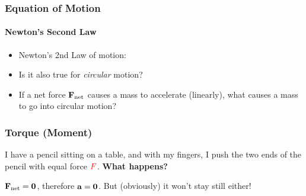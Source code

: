 \documentclass[12pt,compress,aspectratio=169]{beamer}
\newcommand{\mb}[1]{\ensuremath\mathbf{#1}}
\newcommand{\eq}[2]{\vspace{#1}{\Large\begin{displaymath}#2\end{displaymath}}}
\begin{document}
\begin{frame}
  \frametitle{Equation of Motion}
  \framesubtitle{Newton's Second Law}
  \begin{itemize}
  \item Newton's 2nd Law of motion:
    
    \eq{-.2in}{
      \mb{F}_\mathrm{net}=m\mb{a}
  }
  \item Is it also true for \emph{circular} motion?
  \item If a net force $\mb{F}_\mathrm{net}$ causes a mass to accelerate
    (linearly), what causes a mass to go into circular motion?
  \end{itemize}

\end{frame}

\begin{frame}
  \frametitle{Torque (Moment)}
  I have a pencil sitting on a table, and with my fingers, I push the two ends
  of the pencil with equal force $\textcolor{red}{F}$. \textbf{What happens?}
  \begin{center}
  \end{center}
  $\mb{F}_\mathrm{net}=\mb{0}$, therefore $\mb{a}=\mb{0}$. But (obviously) it
  won't stay still either!
\end{frame}
\end{document}
